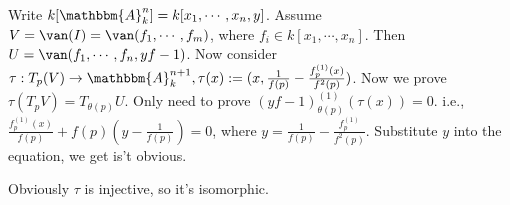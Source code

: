 \documentclass{ctexart}
\begin{document}
\begin{solution}
  Write \(k[\mathbbm{A}_k^n]=k[x_1,\cdots , x_n ,y]\). Assume \(V = \van(I)= \van(f_1,\cdots, f_m)\), where \(f_i \in k[x_1,\cdots,x_n ]\). 
  Then \(U = \van(f_1,\cdots,f_n, yf-1)\). Now consider \(\tau: T_p(V) \to \mathbbm{A}_k^{n+1}, \tau(x):=(x,\frac{1}{f(p)}-\frac{f_p^{(1)}(x)}{f^2(p)})\). 
  Now we prove \(\tau(T_p V)=T_{\theta(p)} U\). 
  Only need to prove \((yf-1)_{\theta(p)}^{(1)}(\tau(x))=0\). 
  i.e., \(\frac{f_p^{(1)}(x)}{f(p)}+f(p)(y-\frac{1}{f(p)})=0\), where \(y = \frac{1}{f(p)}-\frac{f_p^{(1)}}{f^2(p)}\). 
  Substitute \(y\) into the equation, we get is't obvious. 

  Obviously \(\tau\) is injective, so it's isomorphic. 
\end{solution}
\end{document}
